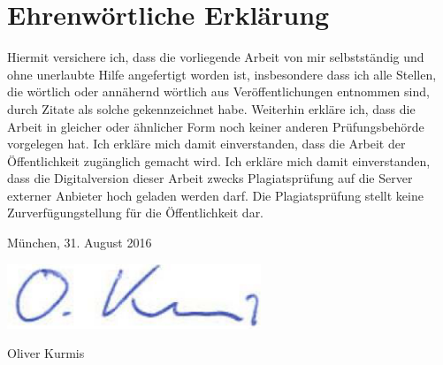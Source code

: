 \newpage

\thispagestyle{empty}

\section*{Ehrenwörtliche Erklärung}  
 
Hiermit  versichere  ich, dass die vorliegende Arbeit von  mir  selbstständig  und 
ohne unerlaubte Hilfe angefertigt worden ist, insbesondere dass ich alle Stellen, 
die wörtlich oder annähernd wörtlich aus Veröffentlichungen entnommen sind, 
durch Zitate als solche gekennzeichnet habe.
Weiterhin erkläre ich, dass die Arbeit in gleicher oder ähnlicher Form noch keiner 
anderen  Prüfungsbehörde  vorgelegen  hat.  Ich  erkläre  mich  damit  einverstanden, 
dass  die  Arbeit  der  Öffentlichkeit  zugänglich  gemacht wird. 
Ich erkläre mich damit einverstanden, dass die Digitalversion dieser 
Arbeit zwecks Plagiatsprüfung auf die Server externer Anbieter hoch geladen 
werden  darf.  Die  Plagiatsprüfung  stellt  keine Zurverfügungstellung  für  die 
Öffentlichkeit dar.
 
München, 31. August 2016

\includegraphics[width=.2\textwidth]{img/unterschrift.png}

Oliver Kurmis
